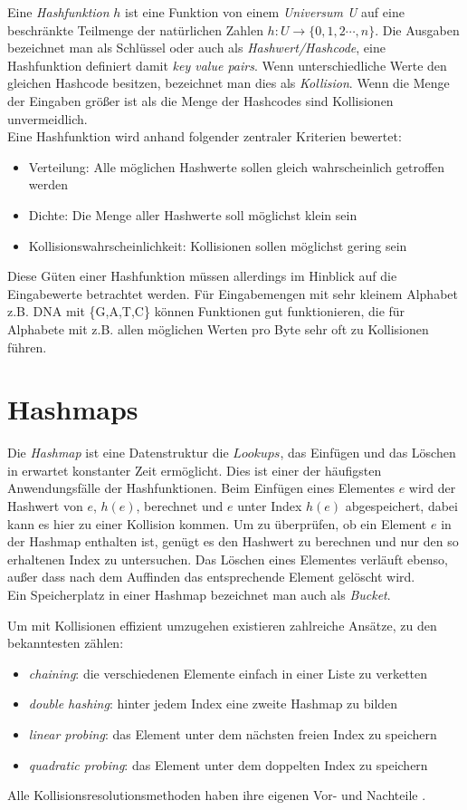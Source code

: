 Eine \emph{Hashfunktion} $h$ ist eine Funktion von einem \emph{Universum U} auf eine beschränkte Teilmenge der natürlichen Zahlen $h:U \rightarrow \{0,1,2\cdots ,n \}$.
Die Ausgaben bezeichnet man als Schlüssel oder auch als \emph{Hashwert/Hashcode}, eine Hashfunktion definiert damit \emph{key value pairs}.
Wenn unterschiedliche Werte den gleichen Hashcode besitzen, bezeichnet man dies als \emph{Kollision}.
Wenn die Menge der Eingaben größer ist als die Menge der Hashcodes sind Kollisionen unvermeidlich.\\
Eine Hashfunktion wird anhand folgender zentraler Kriterien bewertet:
\begin{itemize}
	\item Verteilung: Alle möglichen Hashwerte sollen gleich wahrscheinlich getroffen werden
	\item Dichte: Die Menge aller Hashwerte soll möglichst klein sein
	\item Kollisionswahrscheinlichkeit: Kollisionen sollen möglichst gering sein
\end{itemize}
Diese Güten einer Hashfunktion müssen allerdings im Hinblick auf die Eingabewerte betrachtet werden. Für Eingabemengen mit sehr kleinem Alphabet z.B. DNA mit \{G,A,T,C\} können Funktionen gut funktionieren, die für Alphabete mit z.B. allen möglichen Werten pro Byte sehr oft zu Kollisionen führen\cite{joyhash}.\\

\section{Hashmaps}

\noindent
Die \emph{Hashmap} ist eine Datenstruktur die $Lookups$, das Einfügen und das Löschen in erwartet konstanter Zeit ermöglicht. Dies ist einer der häufigsten Anwendungsfälle der  Hash\-funktionen.
Beim Einfügen eines Elementes $e$ wird der Hashwert von $e$, $h(e)$, berechnet und $e$ unter Index $h(e)$ abgespeichert, dabei kann es hier zu einer Kollision kommen.
Um zu überprüfen, ob ein Element $e$ in der Hashmap enthalten ist, genügt es den Hashwert zu berechnen und nur den so erhaltenen Index zu untersuchen.
Das Löschen eines Elementes verläuft ebenso, außer dass nach dem Auffinden das entsprechende Element gelöscht wird.\\
Ein Speicherplatz in einer Hashmap bezeichnet man auch als \emph{Bucket}.

\noindent
Um mit Kollisionen effizient umzugehen existieren zahlreiche Ansätze, zu den bekanntesten zählen:
\begin{itemize}
	\item \emph{chaining}: die verschiedenen Elemente einfach in einer Liste zu verketten
	\item  \emph{double hashing}: hinter jedem Index eine zweite Hashmap zu bilden
	\item \emph{linear probing}: das  Element unter dem nächsten freien Index zu speichern
	\item \emph{quadratic probing}: das Element unter dem doppelten Index zu speichern
\end{itemize}
Alle Kollisionsresolutionsmethoden haben ihre eigenen Vor- und Nachteile \cite{joyhash}\cite{datastructguide}.



